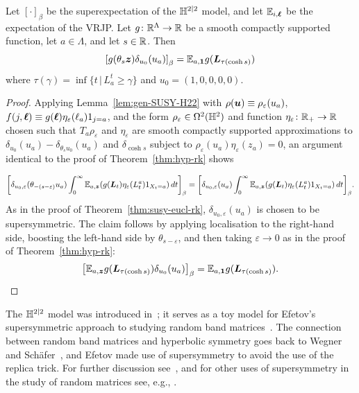 \documentclass[11pt,a4paper]{article}
\begin{document}
\begin{theorem} \label{thm:H22-rk}
  Let $[\cdot]_\beta$ be the superexpectation of the $\mathbb{H}^{2|2}$ model, and let $\mathbb{E}_{i,\boldsymbol{\ell}}$ be the expectation of the VRJP.
  Let $g\colon\mathbb{R}^{\Lambda}\to\mathbb{R}$ be a smooth compactly supported function,
  let $a\in\Lambda$, and let $s\in\mathbb{R}$.  Then
  \begin{equation}\label{eq-susy-h22-rk}
    \uspin{ g(\theta_s\V{z})\delta_{u_0}(u_a)}_\beta =   \E_{a,\V{1}}g(\V{L}_{\tau(\cosh{s})})
  \end{equation}
  where $\tau(\gamma) = \inf \{t \,| \,L_a^t \ge \gamma\}$ and $u_0 = (1,0,0,0,0)$.
\end{theorem}
\begin{proof} Applying Lemma~\ref{lem:gen-SUSY-H22} with
  $\rho(\boldsymbol{u}) \equiv \rho_{\varepsilon}(u_{a})$,
  $f(j,\boldsymbol{\ell}) \equiv g(\boldsymbol{\ell})\eta_{\varepsilon}(\ell_a)1_{j=a}$, and the form
  $\rho_{\varepsilon} \in \Omega^{2}(\mathbb{H}^{2})$ and function $\eta_{\varepsilon} \colon\mathbb{R}_+\to\mathbb{R}$
  chosen such that $T_{a}\rho_\varepsilon$ and $\eta_\varepsilon$ are smooth compactly
  supported approximations to
  $\delta_{u_0}(u_a)-\delta_{\theta_{s}u_0}(u_a)$ and
  $\delta_{\cosh{s}}$ subject to $\rho_{\varepsilon}(u_a)\eta_\varepsilon(z_a)=0$, an argument
  identical to the proof of Theorem~\ref{thm:hyp-rk} shows

  \begin{equation}
  \uspin{\delta_{u_0,\varepsilon}(\theta_{-(s-\varepsilon)}u_a)\int_{0}^{\infty}\E_{a,\V{z}}(g(\V{L}_t)\eta_\varepsilon(L_t^a)1_{X_t = a})\,dt}_\beta =
  \uspin{\delta_{u_0,\varepsilon}(u_a)\int_{0}^{\infty}\E_{a,\V{z}}(g(\V{L}_t)\eta_\varepsilon(L_t^a)1_{X_t = a})\,dt}_\beta.
  \end{equation}
  As in the proof of Theorem~\ref{thm:susy-eucl-rk}, $\delta_{u_0,\varepsilon}(u_a)$ is chosen to be supersymmetric.
  The claim follows by applying localisation to the right-hand side, boosting the left-hand side by $\theta_{s-\varepsilon}$,
  and then taking $\varepsilon \rightarrow 0$ as in the proof of Theorem~\ref{thm:hyp-rk}:
  \begin{equation*}
    \uspin{\E_{a,\V{z}}g(\bm{L}_{\tau(\cosh{s})})\delta_{u_0}(u_a)}_\beta = \E_{a,\V{1}}g(\bm{L}_{\tau(\cosh{s})}).\qedhere
  \end{equation*}
\end{proof}


\begin{remark}
  \label{rem:H22-history} 
  The $\mathbb{H}^{2|2}$ model was introduced in~\cite{MR1134935}; it serves
  as a toy model for Efetov's supersymmetric approach to studying
  random band matrices~\cite{MR708812}. The connection between random
  band matrices and hyperbolic symmetry goes back to Wegner and
  Sch\"{a}fer~\cite{MR600875,MR575503}, and Efetov made use of
  supersymmetry to avoid the use of the replica trick. For further
  discussion see~\cite{MR2728731}, and for other uses of
  supersymmetry in the study of random matrices see,
  e.g., \cite{MR2114358,MR3824956,DisertoriLohmannSodin}.
\end{remark}
\end{document}
